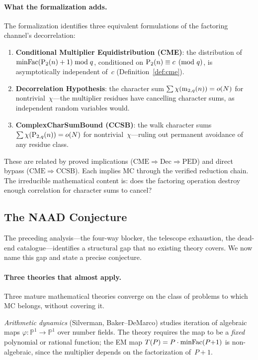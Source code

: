 \paragraph{What the formalization adds.}
The formalization identifies three equivalent formulations of the
factoring channel's decorrelation:
\begin{enumerate}[nosep]
\item \textbf{Conditional Multiplier Equidistribution (CME)}:
  the distribution of $\mathrm{minFac}(\mathrm{P}_{2}(n)+1) \bmod q$, conditioned on
  $\mathrm{P}_{2}(n) \equiv c \pmod{q}$, is asymptotically independent of~$c$
  (Definition~\ref{def:cme}).
\item \textbf{Decorrelation Hypothesis}: the character sum
  $\sum \chi(\mathrm{m}_{2,q}(n)) = o(N)$ for nontrivial~$\chi$---the
  multiplier residues have cancelling character sums, as independent
  random variables would.
\item \textbf{ComplexCharSumBound (CCSB)}: the walk character sums
  $\sum \chi(\mathrm{P}_{2,q}(n)) = o(N)$ for nontrivial~$\chi$---ruling out
  permanent avoidance of any residue class.
\end{enumerate}
These are related by proved implications
($\mathrm{CME} \Rightarrow \mathrm{Dec} \Rightarrow \mathrm{PED}$)
and direct bypass ($\mathrm{CME} \Rightarrow \mathrm{CCSB}$).
Each implies MC through the verified reduction chain.  The irreducible
mathematical content is: does the factoring operation destroy enough
correlation for character sums to cancel?


\subsection{The NAAD Conjecture}
\label{sec:naad}

The preceding analysis---the four-way blocker, the telescope exhaustion,
the dead-end catalogue---identifies a structural gap that no existing
theory covers.  We now name this gap and state a precise conjecture.

\paragraph{Three theories that almost apply.}
Three mature mathematical theories converge on the class of problems to
which MC belongs, without covering it.

\emph{Arithmetic dynamics} (Silverman, Baker--DeMarco) studies iteration
of algebraic maps $\varphi \colon \mathbb{P}^1 \to \mathbb{P}^1$ over
number fields.  The theory requires the map to be a \emph{fixed}
polynomial or rational function; the EM map
$T(P) = P \cdot \mathrm{minFac}(P{+}1)$ is non-algebraic, since the multiplier
depends on the factorization of~$P{+}1$.

